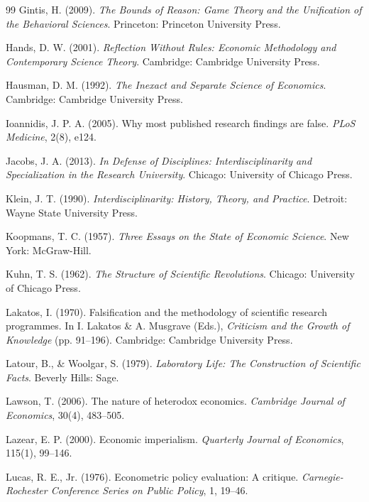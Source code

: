 \documentclass[12pt,a4paper]{article}
\begin{document}
\begin{thebibliography}{99}
Gintis, H. (2009). \textit{The Bounds of Reason: Game Theory and the Unification of the Behavioral Sciences}. Princeton: Princeton University Press.

Hands, D. W. (2001). \textit{Reflection Without Rules: Economic Methodology and Contemporary Science Theory}. Cambridge: Cambridge University Press.

Hausman, D. M. (1992). \textit{The Inexact and Separate Science of Economics}. Cambridge: Cambridge University Press.

Ioannidis, J. P. A. (2005). Why most published research findings are false. \textit{PLoS Medicine}, 2(8), e124.

Jacobs, J. A. (2013). \textit{In Defense of Disciplines: Interdisciplinarity and Specialization in the Research University}. Chicago: University of Chicago Press.

Klein, J. T. (1990). \textit{Interdisciplinarity: History, Theory, and Practice}. Detroit: Wayne State University Press.

Koopmans, T. C. (1957). \textit{Three Essays on the State of Economic Science}. New York: McGraw-Hill.

Kuhn, T. S. (1962). \textit{The Structure of Scientific Revolutions}. Chicago: University of Chicago Press.

Lakatos, I. (1970). Falsification and the methodology of scientific research programmes. In I. Lakatos \& A. Musgrave (Eds.), \textit{Criticism and the Growth of Knowledge} (pp. 91--196). Cambridge: Cambridge University Press.

Latour, B., \& Woolgar, S. (1979). \textit{Laboratory Life: The Construction of Scientific Facts}. Beverly Hills: Sage.

Lawson, T. (2006). The nature of heterodox economics. \textit{Cambridge Journal of Economics}, 30(4), 483--505.

Lazear, E. P. (2000). Economic imperialism. \textit{Quarterly Journal of Economics}, 115(1), 99--146.

Lucas, R. E., Jr. (1976). Econometric policy evaluation: A critique. \textit{Carnegie-Rochester Conference Series on Public Policy}, 1, 19--46.


\end{thebibliography}
\end{document}
